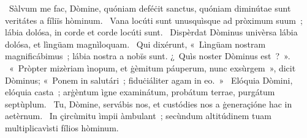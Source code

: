 ~Sàlvum me fac, Dòmine, quóniam deféċit sanctus, quóniam diminútae sunt veritátes a fíliïs hòminum. 
~Vana locúti sunt unusquìsque ad pròximum suum~; lábia dolósa, in corde et corde locúti sunt. 
~Dispèrdat Dòminus univèrsa lábia dolósa, et lìngüam magnìloquam. 
~Qui dixérunt, «~Lìngüam nostram magnificábimus~; lábia nostra a nobïs sunt. ¿~Quìs noster Dòminus est~?~». 
~«~Pròpter mizèriam ìnopum, et ġèmitum páuperum, nunc exsùrgem~», dicit Dòminus; «~Ponem in salutári~; fiduċiáliter agam in eo.~» 
~Elóquia Dòmini, elóquia casta~; arġèntum ìgne examinátum, probátum terrae, purgátum septùplum. 
~Tu, Dòmine, servábis nos, et custódies nos a ġeneraçióne hac in aetèrnum. 
~In çircùmitu ìmpii àmbulant~; secùndum altitúdinem tuam multiplicavìsti fílios hòminum. 

